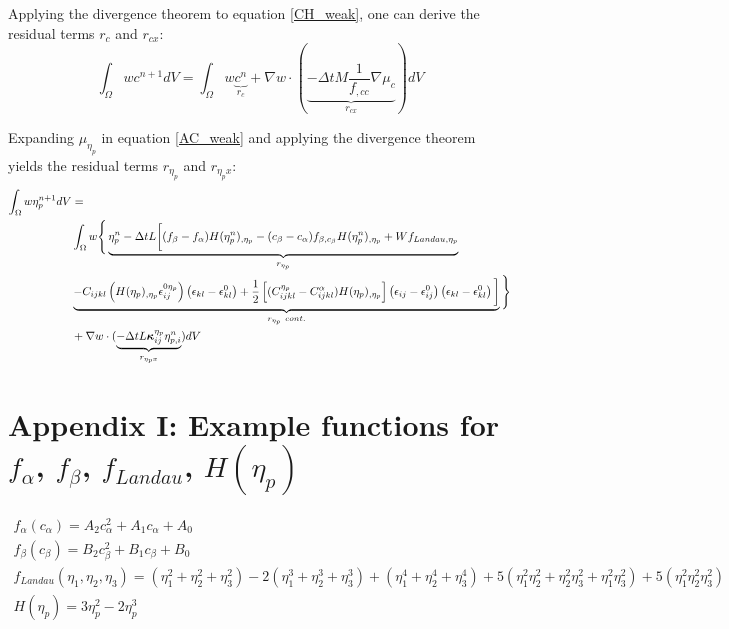 \documentclass[11pt]{article}
\renewcommand{\=}[1]{\stackrel{#1}{=}} %
\theoremstyle{definition}
\theoremstyle{remark}
\def\Bkappa{\mbox{\boldmath$\kappa$}}
\begin{document}
Applying the divergence theorem to equation \ref{CH_weak}, one can derive the residual terms $r_c$ and $r_{cx}$:
\begin{equation}
\int_\Omega w c^{n+1} dV = \int_\Omega w\underbrace{c^{n}}_{r_c}+\nabla w \cdot (\underbrace{-\Delta t  M \frac{1}{f_{,cc}} \nabla \mu_c}_{r_{cx}} ) dV
\end{equation}

Expanding $\mu_{\eta_p}$ in equation \ref{AC_weak} and applying the divergence theorem yields the residual terms $r_{\eta_p}$ and $r_{\eta_p x}$:
\begin{equation}
\begin{split}
\int_\Omega w \eta_p^{n+1} dV &= \\
&\int_\Omega w \Bigg\{\underbrace{\eta_p^{n}-\Delta t L \bigg[(f_{\beta}-f_{\alpha})H(\eta_p^n)_{,\eta_p} -(c_{\beta}-c_{\alpha}) f_{\beta,c_{\beta}}H(\eta_p^n)_{,\eta_p} + W f_{Landau,\eta_p}}_{r_{\eta_p}}  \\ 
&\underbrace{ -C_{ijkl} \left( H(\eta_p)_{,\eta_p} \epsilon_{ij}^{0 \eta_p}\right)\left(\epsilon_{kl} - \epsilon_{kl}^{0} \right) + \frac{1}{2} \left[ (C_{ijkl}^{\eta_p} - C_{ijkl}^{\alpha}) H(\eta_p)_{,\eta_p} \right] \left(\epsilon_{ij} - \epsilon_{ij}^{0} \right) \left(\epsilon_{kl} - \epsilon_{kl}^{0} \right) \bigg] }_{r_{\eta_p}~cont.} \Bigg\} \\
&+ \nabla w \cdot (\underbrace{-\Delta t  L \Bkappa^{\eta_p}_{ij} \eta_{p,i}^n}_{r_{\eta_p x}} ) dV 
\end{split}
\end{equation}

\section{Appendix I: Example functions for $f_{\alpha}$, $f_{\beta}$, $f_{Landau}$, $H(\eta_p)$ }
\begin{gather}
f_{\alpha}(c_{\alpha}) = A_{2} c_{\alpha}^2 + A_{1} c_{\alpha} + A_{0} \\
f_{\beta}(c_{\beta}) = B_{2} c_{\beta}^2 + B_{1} c_{\beta} + B_{0} \\
f_{Landau}(\eta_1, \eta_2, \eta_3) = (\eta_1^2 + \eta_2^2 + \eta_3^2) - 2(\eta_1^3 + \eta_2^3 + \eta_3^3) +  (\eta_1^4 + \eta_2^4 + \eta_3^4) + 5 (\eta_1^2 \eta_2^2 + \eta_2^2 \eta_3^2 + \eta_1^2 \eta_3^2) +  5(\eta_1^2 \eta_2^2 \eta_3^2) \\
H(\eta_p) = 3 \eta_p^2 - 2 \eta_p^3
\end{gather}
\end{document}
